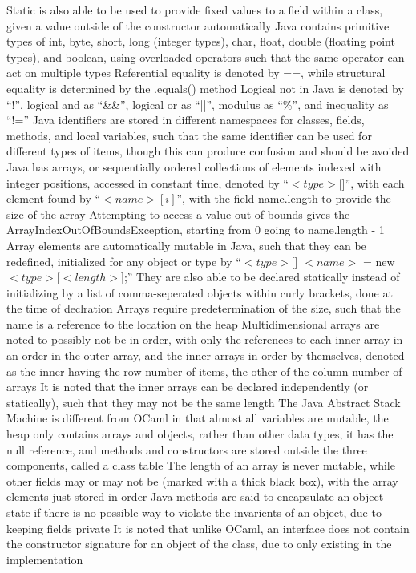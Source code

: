 \documentclass[11 pt, twoside]{article}
\newenvironment{outline*}
{
	\begin{outline}[enumerate]
	}
	{\end{outline}
}
\begin{document}
\begin{outline*}
			\4 Static is also able to be used to provide fixed values to a field within a class, given a value outside of the constructor automatically
\1 Java contains primitive types of int, byte, short, long (integer types), char, float, double (floating point types), and boolean, using overloaded operators such that the same operator can act on multiple types
	\2 Referential equality is denoted by ==, while structural equality is determined by the .equals() method
	\2 Logical not in Java is denoted by ``!'', logical and as ``\&\&'', logical or as ``||'', modulus as ``\%'', and inequality as ``!=''
\1 Java identifiers are stored in different namespaces for classes, fields, methods, and local variables, such that the same identifier can be used for different types of items, though this can produce confusion and should be avoided
\1 Java has arrays, or sequentially ordered collections of elements indexed with integer positions, accessed in constant time, denoted by ``$<type>$[]'', with each element found by ``$<name>[i]$'', with the field name.length to provide the size of the array
	\2 Attempting to access a value out of bounds gives the ArrayIndexOutOfBoundsException, starting from 0 going to name.length - 1
	\2 Array elements are automatically mutable in Java, such that they can be redefined, initialized for any object or type by ``$<type>$[] $<name>$ = new $<type>$[$<length>$];''
		\3 They are also able to be declared statically instead of initializing by a list of comma-seperated objects within curly brackets, done at the time of declration
		\3 Arrays require predetermination of the size, such that the name is a reference to the location on the heap
	\2 Multidimensional arrays are noted to possibly not be in order, with only the references to each inner array in an order in the outer array, and the inner arrays in order by themselves, denoted as the inner having the row number of items, the other of the column number of arrays
		\3 It is noted that the inner arrays can be declared independently (or statically), such that they may not be the same length
\1 The Java Abstract Stack Machine is different from OCaml in that almost all variables are mutable, the heap only contains arrays and objects, rather than other data types, it has the null reference, and methods and constructors are stored outside the three components, called a class table
	\2 The length of an array is never mutable, while other fields may or may not be (marked with a thick black box), with the array elements just stored in order
\1 Java methods are said to encapsulate an object state if there is no possible way to violate the invarients of an object, due to keeping fields private
	\2 It is noted that unlike OCaml, an interface does not contain the constructor signature for an object of the class, due to only existing in the implementation
\end{outline*}
\end{document}
